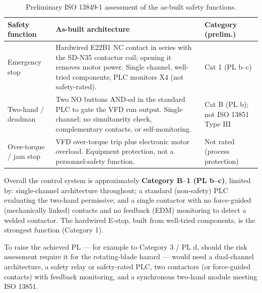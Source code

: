 \documentclass[hidelinks,12pt]{article}
\begin{document}
\begin{table}[H]
\centering
\renewcommand{\arraystretch}{1.3}
\caption{Preliminary ISO 13849-1 assessment of the as-built safety functions.}
\label{tab:pl}
\begin{tabularx}{\textwidth}{|p{2.5cm}|X|p{2.3cm}|}
\hline
\rowcolor{PSUgreen!12}\textbf{Safety function} & \textbf{As-built architecture} & \textbf{Category (prelim.)} \\
\hline
Emergency stop & Hardwired E22B1 NC contact in series with the SD-N35 contactor coil; opening it removes motor power. Single channel, well-tried components; PLC monitors X4 (not safety-rated). & Cat 1 (PL b--c) \\ \hline
Two-hand / deadman & Two NO buttons AND-ed in the standard PLC to gate the VFD run output. Single channel; no simultaneity check, complementary contacts, or self-monitoring. & Cat B (PL b); not ISO 13851 Type III \\ \hline
Over-torque / jam stop & VFD over-torque trip plus electronic motor overload. Equipment protection, not a personnel-safety function. & Not rated (process protection) \\
\hline
\end{tabularx}
\end{table}

Overall the control system is approximately \textbf{Category B--1 (PL b--c)}, limited by: single-channel architecture throughout; a standard (non-safety) PLC evaluating the two-hand permissive; and a single contactor with no force-guided (mechanically linked) contacts and no feedback (EDM) monitoring to detect a welded contactor. The hardwired E-stop, built from well-tried components, is the strongest function (Category 1).

To raise the achieved PL --- for example to Category 3 / PL d, should the risk assessment require it for the rotating-blade hazard --- would need a dual-channel architecture, a safety relay or safety-rated PLC, two contactors (or force-guided contacts) with feedback monitoring, and a synchronous two-hand module meeting ISO 13851.
\end{document}
